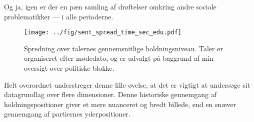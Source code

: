 Og ja, igen er der en pæn samling af drøftelser omkring andre sociale problematikker --- i alle perioderne.

\begin{figure}
\begin{adjustwidth}{-1.6in}{-1.5in}
 \texttt{[image: ../fig/sent\_spread\_time\_sec\_edu.pdf]}
\end{adjustwidth}
\caption{Spredning over talernes gennemsnitlige holdningsniveau. Taler er organiseret efter mødedato, og er udvalgt på baggrund af min oversigt over politiske blokke.}
\label{fig:sentspread}
\end{figure}

Helt overordnet understreger denne lille øvelse, at det er vigtigt at undersøge sit datagrundlag over flere dimensioner.
Denne historiske gennemgang af holdningspositioner giver et mere nuanceret og bredt billede, end en snæver gennemgang af partiernes yderpositioner.


